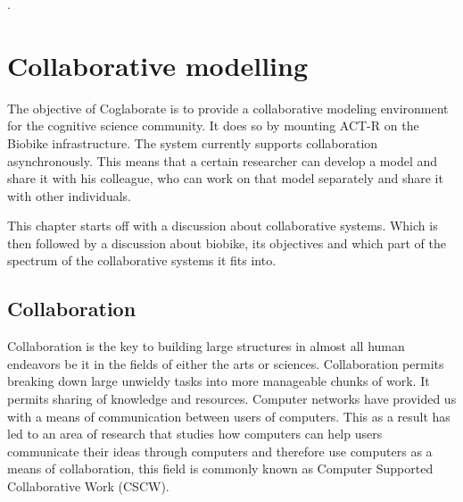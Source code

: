 .%

\chapter{Collaborative modelling}
\label{chap-four}


The objective of Coglaborate is to provide a collaborative modeling
environment for the cognitive science community. It does so by
mounting ACT-R on the Biobike infrastructure. The system currently
supports collaboration asynchronously. This means that a certain
researcher can develop a model and share it with his colleague, who
can work on that model separately and share it with other individuals.


This chapter starts off with a discussion about collaborative
systems. Which is then followed by a discussion about biobike, its
objectives and which part of the spectrum of the collaborative systems
it fits into. 

\section{Collaboration}
Collaboration is the key to building large structures in almost all
human endeavors be it in the fields of either the arts or
sciences. Collaboration permits breaking down large unwieldy tasks
into more manageable chunks of work. It permits sharing of knowledge
and resources. Computer networks have provided us with a means of
communication between users of computers. This as a result has led to
an area of research that studies how computers can help users
communicate their ideas through computers and therefore use computers
as a means of collaboration, this field is commonly known as Computer
Supported Collaborative Work (CSCW).

